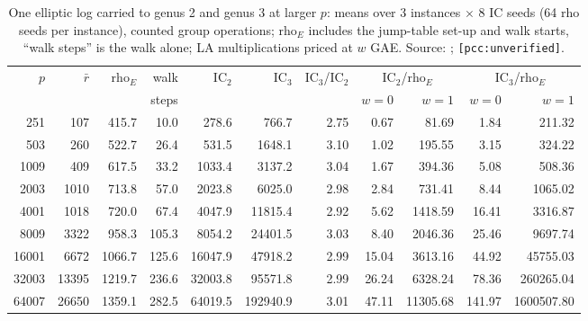 \begin{table}[t]
\centering\footnotesize
\begin{tabular}{@{}rrrrrrrrrrr@{}}
\toprule
$p$ & $\bar r$ & rho$_E$ & walk & IC$_2$ & IC$_3$ & IC$_3$/IC$_2$ & \multicolumn{2}{c}{IC$_2$/rho$_E$} & \multicolumn{2}{c}{IC$_3$/rho$_E$} \\
 & & & steps & & & & $w=0$ & $w=1$ & $w=0$ & $w=1$ \\
\midrule
251 & 107 & 415.7 & 10.0 & 278.6 & 766.7 & 2.75 & 0.67 & 81.69 & 1.84 & 211.32 \\
503 & 260 & 522.7 & 26.4 & 531.5 & 1648.1 & 3.10 & 1.02 & 195.55 & 3.15 & 324.22 \\
1009 & 409 & 617.5 & 33.2 & 1033.4 & 3137.2 & 3.04 & 1.67 & 394.36 & 5.08 & 508.36 \\
2003 & 1010 & 713.8 & 57.0 & 2023.8 & 6025.0 & 2.98 & 2.84 & 731.41 & 8.44 & 1065.02 \\
4001 & 1018 & 720.0 & 67.4 & 4047.9 & 11815.4 & 2.92 & 5.62 & 1418.59 & 16.41 & 3316.87 \\
8009 & 3322 & 958.3 & 105.3 & 8054.2 & 24401.5 & 3.03 & 8.40 & 2046.36 & 25.46 & 9697.74 \\
16001 & 6672 & 1066.7 & 125.6 & 16047.9 & 47918.2 & 2.99 & 15.04 & 3613.16 & 44.92 & 45755.03 \\
32003 & 13395 & 1219.7 & 236.6 & 32003.8 & 95571.8 & 2.99 & 26.24 & 6328.24 & 78.36 & 260265.04 \\
64007 & 26650 & 1359.1 & 282.5 & 64019.5 & 192940.9 & 3.01 & 47.11 & 11305.68 & 141.97 & 1600507.80 \\
\bottomrule
\end{tabular}
\caption[]{One elliptic log carried to genus 2 and genus 3 at larger $p$:
means over 3 instances $\times$ 8 IC seeds (64 rho seeds per instance),
counted group operations; rho$_E$ includes the jump-table set-up and walk
starts, ``walk steps'' is the walk alone; LA multiplications priced at $w$
GAE. Source:
;
\texttt{[pcc:unverified]}.}
\label{tab:jac-chain-large}
\end{table}

